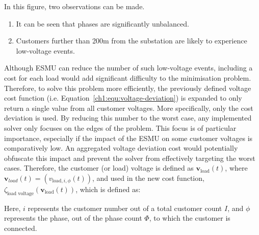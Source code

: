 


In this figure, two observations can be made.

\begin{enumerate}
	\item It can be seen that phases are significantly unbalanced. 
	\item Customers further than 200m from the substation are likely to experience low-voltage events.
\end{enumerate}

Although ESMU can reduce the number of such low-voltage events, including a cost for each load would add significant difficulty to the minimisation problem.
Therefore, to solve this problem more efficiently, the previously defined voltage cost function (i.e. Equation~\ref{ch1:equ:voltage-deviation}) is expanded to only return a single value from all customer voltages.
More specifically, only the cost deviation is used.
By reducing this number to the worst case, any implemented solver only focuses on the edges of the problem.
This focus is of particular importance, especially if the impact of the ESMU on some customer voltages is comparatively low.
An aggregated voltage deviation cost would potentially obfuscate this impact and prevent the solver from effectively targeting the worst cases.
Therefore, the customer (or load) voltage is defined as $\textbf{v}_\text{load}(t)$, where $\textbf{v}_{load}(t) = (v_{\text{load},i,\phi}(t))$, and used in the new cost function, $\zeta_\text{load voltage}(\textbf{v}_\text{load}(t))$, which is defined as:



Here, $i$ represents the customer number out of a total customer count $I$, and $\phi$ represents the phase, out of the phase count $\Phi$, to which the customer is connected.

